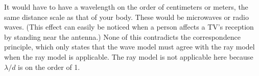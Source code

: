 It would have to have a wavelength on the order of centimeters or meters, the same distance scale
as that of your body. These would be microwaves or radio waves. (This effect can easily be noticed
when a person affects a TV's reception by standing near the antenna.) None of this contradicts the
correspondence principle, which only states that the wave model must agree with the ray model when the
ray model is applicable. The ray model is not applicable here because $\lambda/d$ is on the order
of 1.



